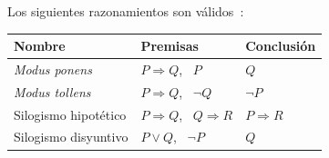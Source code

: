 \begin{proposicion}\label{prop:inferencia}
Los siguientes razonamientos son válidos~\cite[§2.11]{hammack}:
\begin{center}
\begin{tabular}{@{}lll@{}}
\toprule
Nombre & Premisas & Conclusión \\
\midrule
\emph{Modus ponens} & $P\Rightarrow Q$, \ $P$ & $Q$ \\
\emph{Modus tollens} & $P\Rightarrow Q$, \ $\neg Q$ & $\neg P$ \\
Silogismo hipotético & $P\Rightarrow Q$, \ $Q\Rightarrow R$ & $P\Rightarrow R$ \\
Silogismo disyuntivo & $P\vee Q$, \ $\neg P$ & $Q$ \\
\bottomrule
\end{tabular}
\end{center}
\end{proposicion}

\addtocounter{definicion}{1}%

\addtocounter{definicion}{1}%

